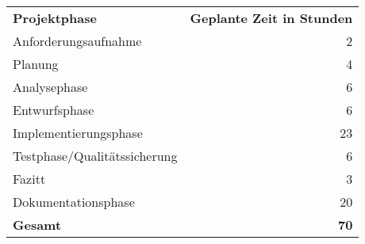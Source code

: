 \begin{tabular}{lr}
\rowcolor{heading}\textbf{Projektphase} & \textbf{Geplante Zeit in Stunden} \\
Anforderungsaufnahme & 2 \\
\rowcolor{odd}Planung & 4 \\
Analysephase & 6 \\
\rowcolor{odd}Entwurfsphase & 6 \\
Implementierungsphase & 23 \\
\rowcolor{odd}Testphase/Qualitätssicherung & 6 \\
Fazitt & 3 \\
\rowcolor{odd}Dokumentationsphase & 20 \\
\hline
\hline
\rowcolor{odd}\textbf{Gesamt} & \textbf{70} \\
\end{tabular}
